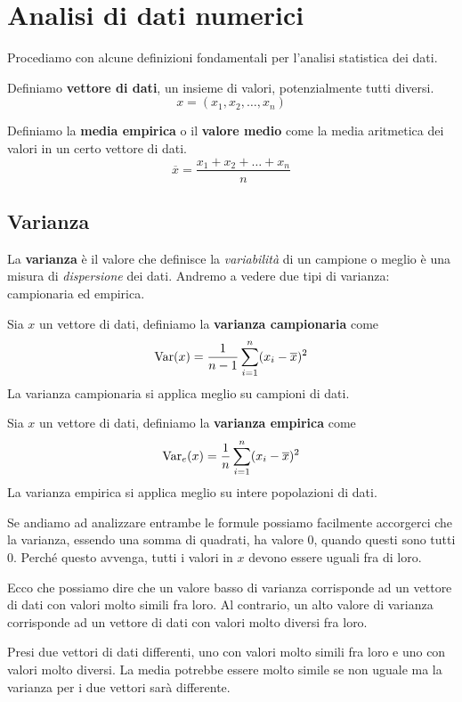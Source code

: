 \chapter{Analisi di dati numerici}
Procediamo con alcune definizioni fondamentali per l'analisi statistica dei dati.

\begin{definition} \label{vettore}
	Definiamo \textbf{vettore di dati}, un insieme di valori, potenzialmente tutti diversi.
	\[ x = (x_1, x_2, \dots, x_n) \]
\end{definition}

\begin{definition}
	Definiamo la \textbf{media empirica} o il \textbf{valore medio} come la media aritmetica dei
	valori in un certo vettore di dati.
	\[ \overline{x} = \frac{x_1 + x_2 + \dots + x_n}{n} \]
\end{definition}

\section{Varianza}
La \textbf{varianza} è il valore che definisce la \emph{variabilità} di un campione o meglio è una
misura di \emph{dispersione} dei dati. Andremo a vedere due tipi di varianza: campionaria ed
empirica.

\begin{definition}
	Sia $x$ un vettore di dati, definiamo la \textbf{varianza campionaria} come
	\[ \operatorname{Var}(x) = \frac{1}{n - 1} \sum_{i=1}^n (x_i - \overline{x})^2 \]
	La varianza campionaria si applica meglio su campioni di dati.
\end{definition}

\begin{definition}
	Sia $x$ un vettore di dati, definiamo la \textbf{varianza empirica} come
	\[ \operatorname{Var}_e(x) = \frac{1}{n} \sum_{i=1}^n (x_i - \overline{x})^2 \]
	La varianza empirica si applica meglio su intere popolazioni di dati.
\end{definition}

\begin{observation}
	Se andiamo ad analizzare entrambe le formule possiamo facilmente accorgerci che la varianza,
	essendo una somma di quadrati, ha valore 0, quando questi sono tutti 0. Perché questo avvenga,
	tutti i valori in $x$ devono essere uguali fra di loro.

	Ecco che possiamo dire che un valore basso di varianza corrisponde ad un vettore di dati con
	valori molto simili fra loro. Al contrario, un alto valore di varianza corrisponde ad un
	vettore di dati con valori molto diversi fra loro.

	Presi due vettori di dati differenti, uno con valori molto simili fra loro e uno con valori
	molto diversi. La media potrebbe essere molto simile se non uguale ma la varianza per i due
	vettori sarà differente.
\end{observation}

